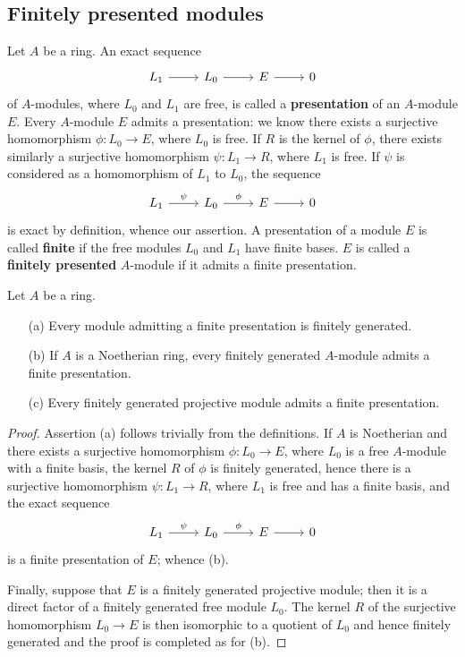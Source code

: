 \subsection{Finitely presented modules}
Let $A$ be a ring. An exact sequence
\[\begin{tikzcd}
L_1\ar[r]&L_0\ar[r]&E\ar[r]&0
\end{tikzcd}\]
of $A$-modules, where $L_0$ and $L_1$ are free, is called a \textbf{presentation} of an $A$-module $E$. Every $A$-module $E$ admits a presentation: we know there exists a surjective homomorphism $\phi:L_0\to E$, where $L_0$ is free. If $R$ is the kernel of $\phi$, there exists similarly a surjective homomorphism $\psi:L_1\to R$, where $L_1$ is free. If $\psi$ is considered as a homomorphism of $L_1$ to $L_0$, the sequence
\[\begin{tikzcd}
L_1\ar[r,"\psi"]&L_0\ar[r,"\phi"]&E\ar[r]&0
\end{tikzcd}
\]
is exact by definition, whence our assertion. A presentation of a module $E$ is called \textbf{finite} if the free modules $L_0$ and $L_1$ have finite bases. $E$ is called a \textbf{finitely presented} $A$-module if it admits a finite presentation.
\begin{proposition}\label{module fp prop}
Let $A$ be a ring.
\begin{itemize}
\item[(a)] Every module admitting a finite presentation is finitely generated.
\item[(b)] If $A$ is a Noetherian ring, every finitely generated $A$-module admits a finite presentation.
\item[(c)] Every finitely generated projective module admits a finite presentation.
\end{itemize}
\end{proposition}
\begin{proof}
Assertion (a) follows trivially from the definitions. If $A$ is Noetherian and there exists a surjective homomorphism $\phi:L_0\to E$, where $L_0$ is a free $A$-module with a finite basis, the kernel $R$ of $\phi$ is finitely generated, hence there is a surjective homomorphism $\psi:L_1\to R$, where $L_1$ is free and has a finite basis, and the exact sequence \[\begin{tikzcd}
L_1\ar[r,"\psi"]&L_0\ar[r,"\phi"]&E\ar[r]&0 \end{tikzcd}\]
is a finite presentation of $E$; whence (b).\par
Finally, suppose that $E$ is a finitely generated projective module; then it is a direct factor of a finitely generated free module $L_0$. The kernel $R$ of the surjective homomorphism $L_0\to E$ is then isomorphic to a quotient of $L_0$ and hence finitely generated and the proof is completed as for (b).
\end{proof}

